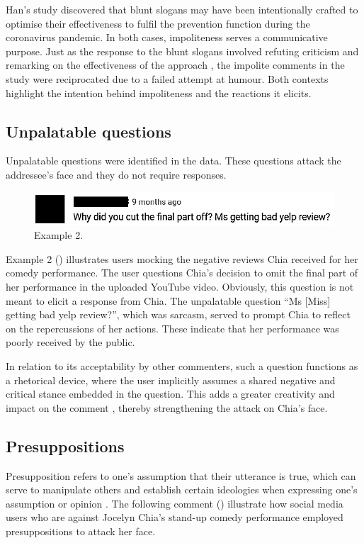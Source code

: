 \documentclass[english]{textolivre}
\begin{document}
Han’s \citeyear{han2021} study discovered that blunt slogans may have been intentionally crafted to optimise their effectiveness to fulfil the prevention function during the coronavirus pandemic. In both cases, impoliteness serves a communicative purpose. Just as the response to the blunt slogans involved refuting criticism and remarking on the effectiveness of the approach \cite{han2021}, the impolite comments in the study were reciprocated due to a failed attempt at humour. Both contexts highlight the intention behind impoliteness and the reactions it elicits.

\subsection{Unpalatable questions}
Unpalatable questions were identified in the data. These questions attack the addressee’s face and they do not require responses.

\begin{figure}[h!]
    \centering
    \begin{minipage}{0.7\linewidth}
    \includegraphics[width=\linewidth]{imagens/figura4.png}
    \caption{Example 2.}
    \label{example-2}
    \end{minipage}
\end{figure}

Example 2 () illustrates users mocking the negative reviews Chia received for her comedy performance. The user questions Chia’s decision to omit the final part of her performance in the uploaded YouTube video. Obviously, this question is not meant to elicit a response from Chia. The unpalatable question “Ms [Miss] getting bad yelp review?”, which was sarcasm, served to prompt Chia to reflect on the repercussions of her actions. These indicate that her performance was poorly received by the public.

In relation to its acceptability by other commenters, such a question functions as a rhetorical device, where the user implicitly assumes a shared negative and critical stance embedded in the question. This adds a greater creativity and impact on the comment \cite{andersson2023}, thereby strengthening the attack on Chia’s face.

\subsection{Presuppositions}
Presupposition refers to one’s assumption that their utterance is true, which can serve to manipulate others and establish certain ideologies when expressing one’s assumption or opinion \cite{chen2019}. The following comment () illustrate how social media users who are against Jocelyn Chia’s stand-up comedy performance employed presuppositions to attack her face.
\end{document}
